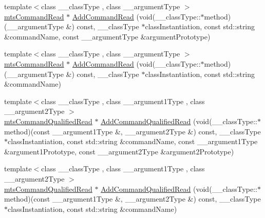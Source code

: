 {\bf }\par
\begin{DoxyCompactItemize}
\item 
{\footnotesize template$<$class \+\_\+\+\_\+class\+Type , class \+\_\+\+\_\+argument\+Type $>$ }\\\hyperlink{classmts_command_read}{mts\+Command\+Read} $\ast$ \hyperlink{classmts_interface_provided_aa4dfb77040a8ee9fd35ff5220c63d7a1}{Add\+Command\+Read} (void(\+\_\+\+\_\+class\+Type\+::$\ast$method)(\+\_\+\+\_\+argument\+Type \&) const, \+\_\+\+\_\+class\+Type $\ast$class\+Instantiation, const std\+::string \&command\+Name, const \+\_\+\+\_\+argument\+Type \&argument\+Prototype)
\item 
{\footnotesize template$<$class \+\_\+\+\_\+class\+Type , class \+\_\+\+\_\+argument\+Type $>$ }\\\hyperlink{classmts_command_read}{mts\+Command\+Read} $\ast$ \hyperlink{classmts_interface_provided_a827bfe0c2f67ef632c709e95805d9bc0}{Add\+Command\+Read} (void(\+\_\+\+\_\+class\+Type\+::$\ast$method)(\+\_\+\+\_\+argument\+Type \&) const, \+\_\+\+\_\+class\+Type $\ast$class\+Instantiation, const std\+::string \&command\+Name)
\end{DoxyCompactItemize}

{\bf }\par
\begin{DoxyCompactItemize}
\item 
{\footnotesize template$<$class \+\_\+\+\_\+class\+Type , class \+\_\+\+\_\+argument1\+Type , class \+\_\+\+\_\+argument2\+Type $>$ }\\\hyperlink{classmts_command_qualified_read}{mts\+Command\+Qualified\+Read} $\ast$ \hyperlink{classmts_interface_provided_ad9101b39fcf98fe7bf80059266089a7f}{Add\+Command\+Qualified\+Read} (void(\+\_\+\+\_\+class\+Type\+::$\ast$method)(const \+\_\+\+\_\+argument1\+Type \&, \+\_\+\+\_\+argument2\+Type \&) const, \+\_\+\+\_\+class\+Type $\ast$class\+Instantiation, const std\+::string \&command\+Name, const \+\_\+\+\_\+argument1\+Type \&argument1\+Prototype, const \+\_\+\+\_\+argument2\+Type \&argument2\+Prototype)
\item 
{\footnotesize template$<$class \+\_\+\+\_\+class\+Type , class \+\_\+\+\_\+argument1\+Type , class \+\_\+\+\_\+argument2\+Type $>$ }\\\hyperlink{classmts_command_qualified_read}{mts\+Command\+Qualified\+Read} $\ast$ \hyperlink{classmts_interface_provided_afca3560989edba15be8901d61958ca19}{Add\+Command\+Qualified\+Read} (void(\+\_\+\+\_\+class\+Type\+::$\ast$method)(const \+\_\+\+\_\+argument1\+Type \&, \+\_\+\+\_\+argument2\+Type \&) const, \+\_\+\+\_\+class\+Type $\ast$class\+Instantiation, const std\+::string \&command\+Name)
\end{DoxyCompactItemize}

